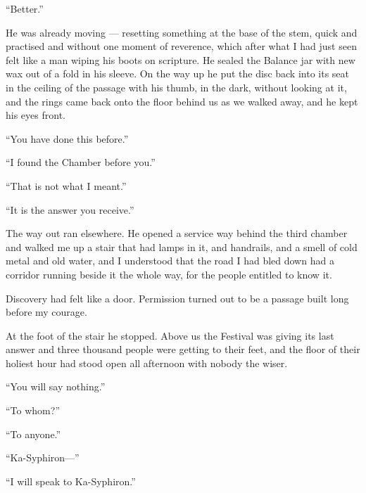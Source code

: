 ``Better.''\par

He was already moving --- resetting something at the base of the stem, quick and practised and without one moment of reverence, which after what I had just seen felt like a man wiping his boots on scripture. He sealed the Balance jar with new wax out of a fold in his sleeve. On the way up he put the disc back into its seat in the ceiling of the passage with his thumb, in the dark, without looking at it, and the rings came back onto the floor behind us as we walked away, and he kept his eyes front.\par

``You have done this before.''\par

``I found the Chamber before you.''\par

``That is not what I meant.''\par

``It is the answer you receive.''\par

\ornament

The way out ran elsewhere. He opened a service way behind the third chamber and walked me up a stair that had lamps in it, and handrails, and a smell of cold metal and old water, and I understood that the road I had bled down had a corridor running beside it the whole way, for the people entitled to know it.\par

Discovery had felt like a door. Permission turned out to be a passage built long before my courage.\par

At the foot of the stair he stopped. Above us the Festival was giving its last answer and three thousand people were getting to their feet, and the floor of their holiest hour had stood open all afternoon with nobody the wiser.\par

``You will say nothing.''\par

``To whom?''\par

``To anyone.''\par

``Ka-Syphiron---''\par

``I will speak to Ka-Syphiron.''\par

